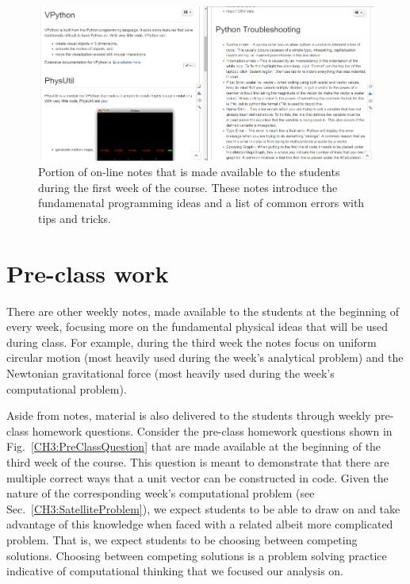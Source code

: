 \documentclass{msuphddissertation}
\begin{document}
\begin{doublespace}
\begin{figure}[ht]\centering
\includegraphics[scale=1]{images/CH3VPythonNotes.pdf}
\caption{Portion of on-line notes that is made available to the students during the first week of the course.  These notes introduce the fundamenatal programming ideas and a list of common errors with tips and tricks.}\label{CH3:VPythonNotes}
\end{figure} 

\section{Pre-class work}

There are other weekly notes, made available to the students at the beginning of every week, focusing more on the fundamental physical ideas that will be used during class.  For example, during the third week the notes focus on uniform circular motion (most heavily used during the week's analytical problem) and the Newtonian gravitational force (most heavily used during the week's computational problem).

Aside from notes, material is also delivered to the students through weekly pre-class homework questions.  Consider the pre-class homework questions shown in Fig.~\ref{CH3:PreClassQuestion} that are made available at the beginning of the third week of the course.  This question is meant to demonstrate that there are multiple correct ways that a unit vector can be constructed in code.  Given the nature of the corresponding week's computational problem (see Sec.~\ref{CH3:SatelliteProblem}), we expect students to be able to draw on and take advantage of this knowledge when faced with a related albeit more complicated problem.  That is, we expect students to be choosing between competing solutions.  Choosing between competing solutions is a problem solving practice indicative of computational thinking that we focused our analysis on.


\end{doublespace}
\end{document}
